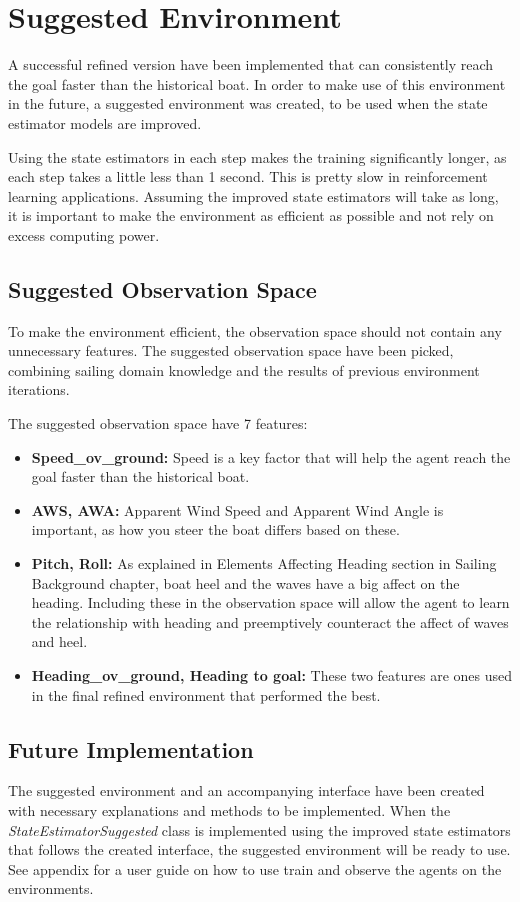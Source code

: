 \documentclass[12pt,twoside]{report}
\begin{document}
\section{Suggested Environment}
A successful refined version have been implemented that can consistently reach the goal faster than the historical boat. In order to make use of this environment in the future, a suggested environment was created, to be used when the state estimator models are improved.

Using the state estimators in each step makes the training significantly longer, as each step takes a little less than 1 second. This is pretty slow in reinforcement learning applications. Assuming the improved state estimators will take as long, it is important to make the environment as efficient as possible and not rely on excess computing power.

\subsection{Suggested Observation Space}
To make the environment efficient, the observation space should not contain any unnecessary features. The suggested observation space have been picked, combining sailing domain knowledge and the results of previous environment iterations.

The suggested observation space have 7 features:
\begin{itemize}
    \item \textbf{Speed\_ov\_ground:} Speed is a key factor that will help the agent reach the goal faster than the historical boat.
    \item \textbf{AWS, AWA:} Apparent Wind Speed and Apparent Wind Angle is important, as how you steer the boat differs based on these.
    \item \textbf{Pitch, Roll:} As explained in Elements Affecting Heading section in Sailing Background chapter, boat heel and the waves have a big affect on the heading. Including these in the observation space will allow the agent to learn the relationship with heading and preemptively counteract the affect of waves and heel.
    \item \textbf{Heading\_ov\_ground, Heading to goal:} These two features are ones used in the final refined environment that performed the best.
\end{itemize}

\subsection{Future Implementation}
The suggested environment and an accompanying interface have been created with necessary explanations and methods to be implemented. When the \textit{StateEstimatorSuggested} class is implemented using the improved state estimators that follows the created interface, the suggested environment will be ready to use. See appendix for a user guide on how to use train and observe the agents on the environments.
\end{document}
